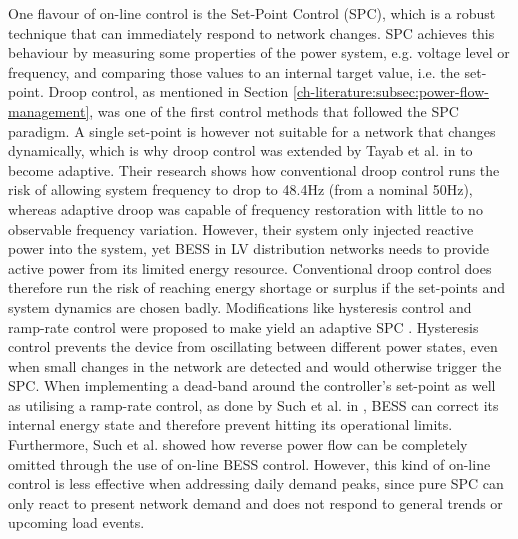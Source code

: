 One flavour of on-line control is the Set-Point Control (SPC), which is a robust technique that can immediately respond to network changes.
SPC achieves this behaviour by measuring some properties of the power system, e.g. voltage level or frequency, and comparing those values to an internal target value, i.e. the set-point.
Droop control, as mentioned in Section \ref{ch-literature:subsec:power-flow-management}, was one of the first control methods that followed the SPC paradigm.
A single set-point is however not suitable for a network that changes dynamically, which is why droop control was extended by Tayab et al. in \cite{Tayab2017} to become adaptive.
Their research shows how conventional droop control runs the risk of allowing system frequency to drop to 48.4Hz (from a nominal 50Hz), whereas adaptive droop was capable of frequency restoration with little to no observable frequency variation.
However, their system only injected reactive power into the system, yet BESS in LV distribution networks needs to provide active power from its limited energy resource.
Conventional droop control does therefore run the risk of reaching energy shortage or surplus if the set-points and system dynamics are chosen badly.
Modifications like hysteresis control and ramp-rate control were proposed to make yield an adaptive SPC \cite{Blaabjerg2006, Malesani1990, Xu2011a, Such2012}.
Hysteresis control prevents the device from oscillating between different power states, even when small changes in the network are detected and would otherwise trigger the SPC.
When implementing a dead-band around the controller's set-point as well as utilising a ramp-rate control, as done by Such et al. in \cite{Such2012}, BESS can correct its internal energy state and therefore prevent hitting its operational limits.
Furthermore, Such et al. showed how reverse power flow can be completely omitted through the use of on-line BESS control.
However, this kind of on-line control is less effective when addressing daily demand peaks, since pure SPC can only react to present network demand and does not respond to general trends or upcoming load events.

